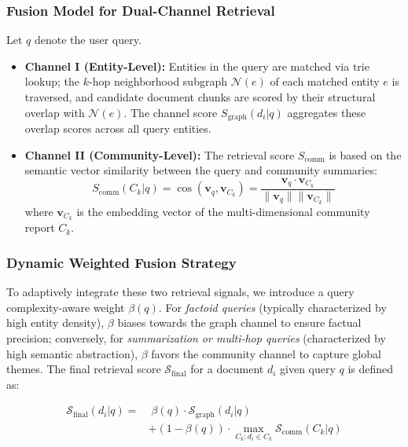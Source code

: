 \documentclass[11pt]{article}
\newcommand{\sgraph}{S_{\mathrm{graph}}}
\newcommand{\scomm}{S_{\mathrm{comm}}}
\begin{document}
\subsubsection{Fusion Model for Dual-Channel Retrieval}
Let $q$ denote the user query.
\begin{itemize}
    \item \textbf{Channel I (Entity-Level):} Entities in the query are matched via trie lookup; the $k$-hop neighborhood subgraph $\mathcal{N}(e)$ of each matched entity $e$ is traversed, and candidate document chunks are scored by their structural overlap with $\mathcal{N}(e)$. The channel score $\sgraph(d_i | q)$ aggregates these overlap scores across all query entities.

    \item \textbf{Channel II (Community-Level):} The retrieval score $\scomm$ is based on the semantic vector similarity between the query and community summaries:
    \begin{equation}
        \scomm(C_k | q) = \cos(\bm{v}_q, \bm{v}_{C_k}) = \frac{\bm{v}_q \cdot \bm{v}_{C_k}}{\|\bm{v}_q\| \|\bm{v}_{C_k}\|}
    \end{equation}
    where $\bm{v}_{C_k}$ is the embedding vector of the multi-dimensional community report $C_k$.
\end{itemize}
\subsubsection{Dynamic Weighted Fusion Strategy}
To adaptively integrate these two retrieval signals, we introduce a query complexity-aware weight $\beta(q)$. For \textit{factoid queries} (typically characterized by high entity density), $\beta$ biases towards the graph channel to ensure factual precision; conversely, for \textit{summarization or multi-hop queries} (characterized by high semantic abstraction), $\beta$ favors the community channel to capture global themes. The final retrieval score $\mathcal{S}_{\text{final}}$ for a document $d_i$ given query $q$ is defined as:

\begin{equation}
\begin{split}
    \mathcal{S}_{\text{final}}(d_i | q) = &\;\beta(q) \cdot \mathcal{S}_{\text{graph}}(d_i | q) \\
    &+ (1 - \beta(q)) \cdot \max_{C_k: d_i \in C_k} \mathcal{S}_{\text{comm}}(C_k | q)
\end{split}
    \label{eq:dynamic_fusion}
\end{equation}
\end{document}
